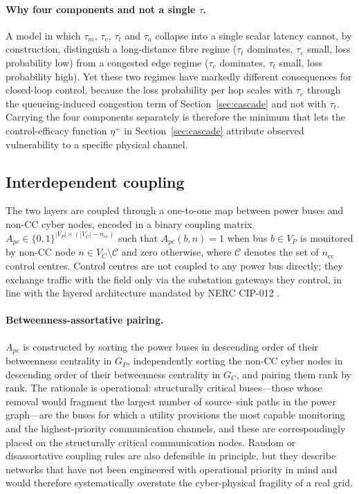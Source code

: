 \paragraph{Why four components and not a single $\tau$.}
A model in which $\tau_m$, $\tau_e$, $\tau_t$ and $\tau_a$ collapse
into a single scalar latency cannot, by construction, distinguish
a long-distance fibre regime ($\tau_t$ dominates, $\tau_e$ small,
loss probability low) from a congested edge regime ($\tau_e$
dominates, $\tau_t$ small, loss probability high).  Yet these two
regimes have markedly different consequences for closed-loop
control, because the loss probability per hop scales with $\tau_e$
through the queueing-induced congestion term of
Section~\ref{sec:cascade} and not with $\tau_t$.  Carrying the four
components separately is therefore the minimum that lets the
control-efficacy function $\eta^{+}$ in Section~\ref{sec:cascade}
attribute observed vulnerability to a specific physical channel.

\subsection{Interdependent coupling}\label{sec:coupling}

The two layers are coupled through a one-to-one map between power
buses and non-CC cyber nodes, encoded in a binary coupling matrix
$A_{pc}\in\{0,1\}^{|V_P|\times(|V_C|-n_{\text{cc}})}$ such that
$A_{pc}(b,n)=1$ when bus $b\in V_P$ is monitored by non-CC node
$n\in V_C\setminus\mathcal{C}$ and zero otherwise, where
$\mathcal{C}$ denotes the set of $n_{\text{cc}}$ control centres.
Control centres are not coupled to any power bus directly; they
exchange traffic with the field only via the substation gateways
they control, in line with the layered architecture mandated by
NERC CIP-012 \citep{NERC_CIP012}.

\paragraph{Betweenness-assortative pairing.}
$A_{pc}$ is constructed by sorting the power buses in descending
order of their betweenness centrality in $G_P$, independently
sorting the non-CC cyber nodes in descending order of their
betweenness centrality in $G_C$, and pairing them rank by rank.
The rationale is operational: structurally critical buses---those
whose removal would fragment the largest number of source--sink
paths in the power graph---are the buses for which a utility
provisions the most capable monitoring and the highest-priority
communication channels, and these are correspondingly placed on
the structurally critical communication nodes.  Random or
disassortative coupling rules are also defensible in principle,
but they describe networks that have not been engineered with
operational priority in mind and would therefore systematically
overstate the cyber-physical fragility of a real grid.

